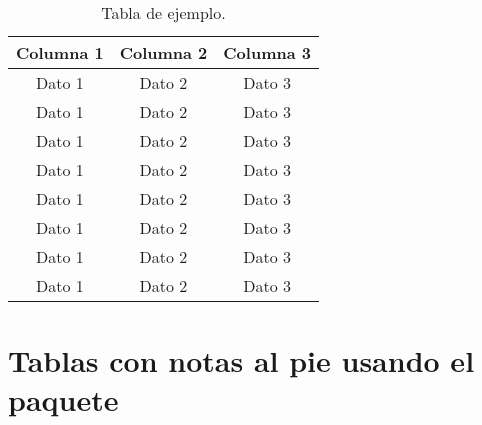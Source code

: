 \begin{table}[!ht]
  \caption{Tabla de ejemplo.}
  \centering
  \begin{tabular}{ccc}

    \toprule
    \textbf{Columna 1} & \textbf{Columna 2} & \textbf{Columna 3}\\
    \midrule
    Dato 1             & Dato 2             & Dato 3            \\
    Dato 1             & Dato 2             & Dato 3            \\
    Dato 1             & Dato 2             & Dato 3            \\
    Dato 1             & Dato 2             & Dato 3            \\
    Dato 1             & Dato 2             & Dato 3            \\
    Dato 1             & Dato 2             & Dato 3            \\
    Dato 1             & Dato 2             & Dato 3            \\
    Dato 1             & Dato 2             & Dato 3            \\
    \bottomrule

  \end{tabular}
  \label{tab:ejemplo1}
\end{table}

\lipsum[10]

\section[Tablas con notas al pie]{Tablas con notas al pie usando el paquete\\ }
\lipsum[11]



